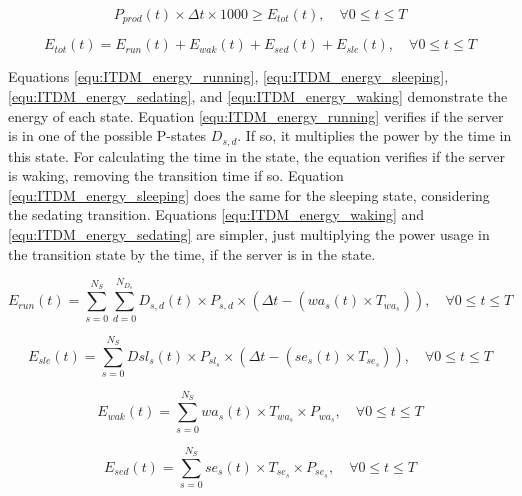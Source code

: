 \begin{equation}
    \label{equ:ITDM_energy_less_envelope}
    P_{prod}(t) \times \Delta t \times 1000 \ge E_{tot}(t), \quad \forall 0 \le t \le T
\end{equation}

\begin{equation}
    \label{equ:ITDM_energy_usage}
    E_{tot}(t) = E_{run}(t) + E_{wak}(t) + E_{sed}(t) + E_{sle}(t), \quad \forall 0 \le t \le T
\end{equation}

Equations \ref{equ:ITDM_energy_running}, \ref{equ:ITDM_energy_sleeping}, \ref{equ:ITDM_energy_sedating}, and \ref{equ:ITDM_energy_waking} demonstrate the energy of each state. Equation \ref{equ:ITDM_energy_running} verifies if the server is in one of the possible P-states $D_{s,d}$. If so, it multiplies the power by the time in this state. For calculating the time in the state, the equation verifies if the server is waking, removing the transition time if so. Equation \ref{equ:ITDM_energy_sleeping} does the same for the sleeping state, considering the sedating transition. Equations \ref{equ:ITDM_energy_waking} and \ref{equ:ITDM_energy_sedating} are simpler, just multiplying the power usage in the transition state by the time, if the server is in the state.

\begin{equation}
    \label{equ:ITDM_energy_running}
    E_{run}(t) = \sum_{s=0}^{N_{S}}\sum_{d=0}^{N_{D_{s}}} D_{s,d}(t) \times P_{s,d} \times (\Delta t - (wa_{s}(t) \times T_{wa_{s}})), \quad \forall 0 \le t \le T
\end{equation}

\begin{equation}
    \label{equ:ITDM_energy_sleeping}
    E_{sle}(t) = \sum_{s=0}^{N_{S}} Dsl_{s}(t) \times P_{sl_{s}} \times (\Delta t - (se_{s}(t) \times T_{se_{s}})), \quad \forall 0 \le t \le T
\end{equation}

\begin{equation}
    \label{equ:ITDM_energy_waking}
    E_{wak}(t) = \sum_{s=0}^{N_{S}} wa_{s}(t) \times T_{wa_{s}} \times P_{wa_{s}}, \quad \forall 0 \le t \le T
\end{equation}

\begin{equation}
    \label{equ:ITDM_energy_sedating}
    E_{sed}(t) = \sum_{s=0}^{N_{S}} se_{s}(t) \times T_{se_{s}} \times P_{se_{s}}, \quad \forall 0 \le t \le T
\end{equation}

